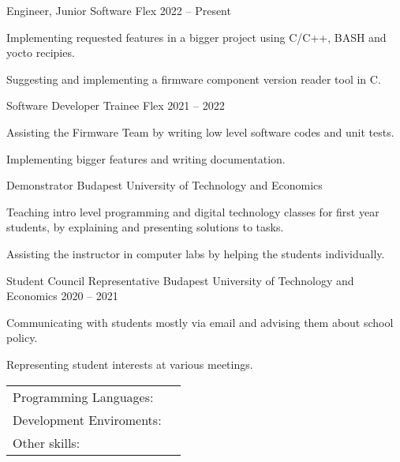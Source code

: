 \documentclass[]{awesome-cv}
\begin{document}
\vspace{-2mm}
\begin{cventries}
	\cventry
	{Engineer, Junior Software}
	{Flex}
	{}
	{2022 – Present}
	{\begin{cvitems}
		\item {Implementing requested features in a bigger project using C/C++, BASH and yocto recipies.}
		\item {Suggesting and implementing a firmware component version reader tool in C.}
		\end{cvitems}}
	\cventry
	{Software Developer Trainee}
	{Flex}
	{}
	{2021 – 2022}
	{\begin{cvitems}
		\item {Assisting the Firmware Team by writing low level software codes and unit tests.}
		\item {Implementing bigger features and writing documentation.}
		\end{cvitems}}
	\cventry
	{Demonstrator}
	{Budapest University of Technology and Economics}
	{}
	{}
	{\begin{cvitems}
		\item {Teaching intro level programming and digital technology classes for first year students, by explaining and presenting solutions to tasks.}
		\item {Assisting the instructor in computer labs by helping the students individually.}
		\end{cvitems}}
	\cventry
	{Student Council Representative}
	{Budapest University of Technology and Economics}
	{}
	{2020 – 2021}
	{\begin{cvitems}
		\item {Communicating with students mostly via email and advising them about school policy.}
		\item {Representing student interests at various meetings.}
		\end{cvitems}}
\end{cventries}
\begin{cventries}
	\cventry
	{}
	{\def\arraystretch{1.15}{\begin{tabular}{ l l }
		Programming Languages:  & {\skill{ C/C++, Embedded C, Rust, Python, BASH Scripting, Matlab, Verilog, Robot Framework}} \\
		Development Enviroments:  & {\skill{ gcc/g++, Makefiles, CMake, Visual Studio, Eclipse based IDE-s, OpenBMC, Petalinux}} \\
		Other skills:  & {\skill{ Git, Linux (usage and development), Yocto Project, PCB Design (KiCAD), JIRA, Confluence}} \\
		\end{tabular}}}
	{}
	{}
	{}
\end{cventries}
\end{document}

